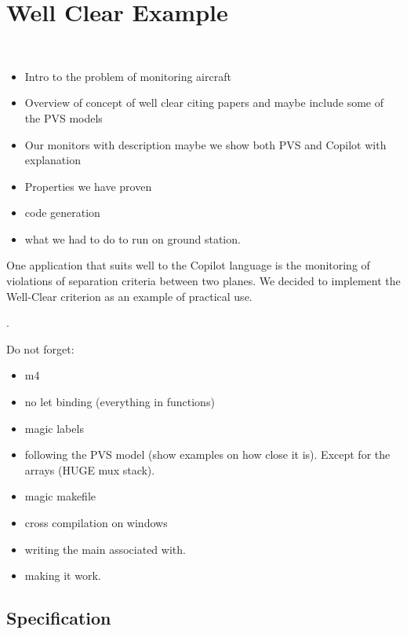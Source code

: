\section{Well Clear Example}~\label{sec:WellClear}


\begin{itemize}
\item Intro to the problem of monitoring aircraft
\item Overview of concept of well clear citing papers and maybe include some of the PVS models
\item Our monitors with description maybe we show both PVS and Copilot with explanation
\item Properties we have proven
\item code generation 
\item what we had to do to run on ground station. 
\end{itemize}

One application that suits well to the Copilot language is the monitoring of
violations of separation criteria between two planes. We decided to implement
the Well-Clear criterion as an example of practical use.

.

Do not forget:

\begin{itemize}
	\item m4
	\item no let binding (everything in functions)
	\item magic labels
	\item following the PVS model (show examples on how close it is). Except for the arrays (HUGE mux stack).
	\item magic makefile
	\item cross compilation on windows
	\item writing the main associated with.
	\item making it work.
\end{itemize}

\subsection{Specification}

